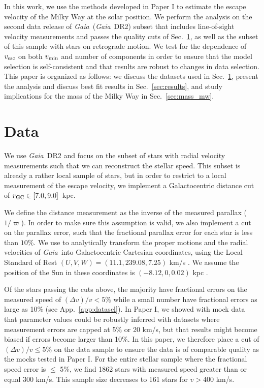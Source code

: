 \documentclass[twocolumn,preprintnumbers]{aastex63}
\DeclareRobustCommand{\Sec}[1]{Sec.~\ref{#1}}
\DeclareRobustCommand{\App}[1]{App.~\ref{#1}}
\newcommand{\Gaia}{\textit{Gaia}~}
\newcommand{\vesc}{v_{\rm esc}}
\newcommand{\vmin}{v_{\rm min}}
\begin{document}
In this work, we use the methods developed in Paper I to estimate the escape velocity of the Milky Way at the solar position. We perform the analysis on the second data release of \Gaia (\Gaia DR2) subset that includes line-of-sight velocity measurements and passes the quality cuts of \Sec{sec:data}, as well as the subset of this sample with stars on retrograde motion. We test for the dependence of $\vesc$ on both $\vmin$ and number of components in order to ensure that the model selection is self-consistent and that results are robust to changes in data selection. 
This paper is organized as follows: we discuss the datasets used in \Sec{sec:data}, present the analysis and discuss best fit results in \Sec{sec:results}, and study implications for the mass of the Milky Way in \Sec{sec:mass_mw}. 


\section{Data}
\label{sec:data}


We use \Gaia DR2 and focus on the subset of stars with radial velocity measurements \citep{2016A&A...595A...1G,2018arXiv180409365G} such that we can reconstruct the stellar speed. This subset is already a rather local sample of stars, but in order to restrict to a local measurement of the escape velocity, we implement a Galactocentric distance cut of $r_{\rm{GC}} \in [7.0, 9.0]$~kpc. 

We define the distance measurement as the inverse of the measured parallax ($1/ \varpi $). In order to make sure this assumption is valid, we also implement a cut on the parallax error, such that the fractional parallax error for each star is less than $10\%$. 
We use \cite{Bovy:2011aa} to analytically transform the proper motions and the radial velocities of \Gaia  into Galactocentric Cartesian coordinates, using the Local Standard of Rest $(U,V,W) = (11.1, 239.08, 7.25)$ km/s \citep{2010MNRAS.403.1829S}. We assume the position of the Sun in these coordinates is $(-8.12, 0, 0.02)$ kpc \citep{2019MNRAS.482.1417B}.

Of the stars passing the cuts above, the majority have fractional errors on the measured speed of $(\Delta v)/v < 5\%$ while a small number have fractional errors as large as 10\% (see \App{app:datasel}). In Paper I, we showed with mock data that parameter values could be robustly inferred with datasets where measurement errors are capped at 5\% or 20 km/s, but that results might become biased if errors become larger than 10\%. In this paper, we therefore place a cut of $(\Delta v)/v \le 5\%$  on the data sample to ensure the data is of comparable quality as the mocks tested in Paper I.  For the entire stellar sample where the fractional speed error is $\le$ 5\%, we find 1862 stars with measured speed greater than or equal 300 km/s. 
This sample size decreases to 161 stars for $v > 400$ km/s. 
\end{document}
